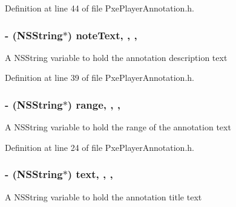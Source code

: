 Definition at line 44 of file Pxe\-Player\-Annotation.\-h.

\hypertarget{interface_pxe_player_annotation_a3c3cccd23a46f7ed8726e4788ca32517}{
\subsubsection[{note\-Text}]{\setlength{\rightskip}{0pt plus 5cm}-\/ (N\-S\-String$\ast$) note\-Text\hspace{0.3cm}{\ttfamily [read]}, {\ttfamily [write]}, {\ttfamily [nonatomic]}, {\ttfamily [strong]}}}\label{interface_pxe_player_annotation_a3c3cccd23a46f7ed8726e4788ca32517}
A N\-S\-String variable to hold the annotation description text 

Definition at line 39 of file Pxe\-Player\-Annotation.\-h.

\hypertarget{interface_pxe_player_annotation_ab9e7b0ca1d2b10388be7ee64fa7f348b}{
\subsubsection[{range}]{\setlength{\rightskip}{0pt plus 5cm}-\/ (N\-S\-String$\ast$) range\hspace{0.3cm}{\ttfamily [read]}, {\ttfamily [write]}, {\ttfamily [nonatomic]}, {\ttfamily [strong]}}}\label{interface_pxe_player_annotation_ab9e7b0ca1d2b10388be7ee64fa7f348b}
A N\-S\-String variable to hold the range of the annotation text 

Definition at line 24 of file Pxe\-Player\-Annotation.\-h.

\hypertarget{interface_pxe_player_annotation_a385bff815a8ba52e6c228d0cb0003e2f}{
\subsubsection[{text}]{\setlength{\rightskip}{0pt plus 5cm}-\/ (N\-S\-String$\ast$) text\hspace{0.3cm}{\ttfamily [read]}, {\ttfamily [write]}, {\ttfamily [nonatomic]}, {\ttfamily [strong]}}}\label{interface_pxe_player_annotation_a385bff815a8ba52e6c228d0cb0003e2f}
A N\-S\-String variable to hold the annotation title text 

